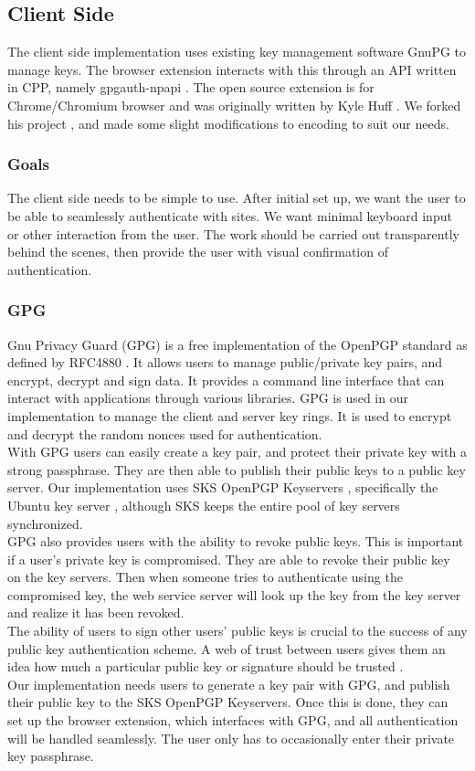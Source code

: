 \documentclass[11pt]{article}
\begin{document}
\subsection{Client Side}
The client side implementation uses existing key management software GnuPG to manage keys. The browser extension interacts with this through an API written in CPP, namely gpgauth-npapi \cite{npapi}. The open source extension is for Chrome/Chromium browser and was originally written by Kyle Huff \cite{ext}. We forked his project \cite{extFork}, and made some slight modifications to encoding to suit our needs.  
\subsubsection{Goals}
The client side needs to be simple to use. After initial set up, we want the user to be able to seamlessly authenticate with sites. We want minimal keyboard input or other interaction from the user. The work should be carried out transparently behind the scenes, then provide the user with visual confirmation of authentication.

\subsubsection{GPG}
Gnu Privacy Guard (GPG) is a free implementation of the OpenPGP standard as defined by RFC4880 \cite{gpg}. It allows users to manage public/private key pairs, and encrypt, decrypt and sign data. It provides a command line interface that can interact with applications through various libraries. GPG is used in our implementation to manage the client and server key rings. It is used to encrypt and decrypt the random nonces used for authentication.\\
With GPG users can easily create a key pair, and protect their private key with a strong passphrase. They are then able to publish their public keys to a public key server. Our implementation uses SKS OpenPGP Keyservers \cite{sks}, specifically the Ubuntu key server \cite{ubuntuKey}, although SKS keeps the entire pool of key servers synchronized.\\
GPG also provides users with the ability to revoke public keys. This is important if a user's private key is compromised. They are able to revoke their public key on the key servers. Then when someone tries to authenticate using the compromised key, the web service server will look up the key from the key server and realize it has been revoked.\\
The ability of users to sign other users' public keys is crucial to the success of any public key authentication scheme. A web of trust between users gives them an idea how much a particular public key or signature should be trusted \cite{weboftrust}.\\
Our implementation needs users to generate a key pair with GPG, and publish their public key to the SKS OpenPGP Keyservers. Once this is done, they can set up the browser extension, which interfaces with GPG, and all authentication will be handled seamlessly. The user only has to occasionally enter their private key passphrase.
\end{document}
